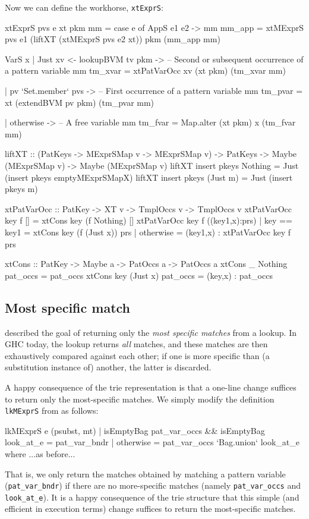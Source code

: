 \documentclass[acmsmall]{acmart}
\theoremstyle{theorem}
\theoremstyle{definition}
\theoremstyle{remark}
\begin{document}
Now we can define the workhorse, \lstinline{xtExprS}:
\begin{code}
xtExprS pvs e xt pkm mm
  = case e of
      AppS e1 e2 -> mm { mm_app = xtMExprS pvs e1 (liftXT (xtMExprS pvs e2 xt))
                                           pkm (mm_app mm) }

      VarS x | Just xv <- lookupBVM tv pkm
             -> -- Second or subsequent occurrence of a pattern variable
                mm { tm_xvar = xtPatVarOcc xv (xt pkm) (tm_xvar mm) }

             | pv `Set.member` pvs
             -> -- First occurrence of a pattern variable
                mm { tm_pvar = xt (extendBVM pv pkm) (tm_pvar mm) }

             | otherwise
             -> -- A free variable
                mm { tm_fvar = Map.alter (xt pkm) x (tm_fvar mm) }

liftXT :: (PatKeys -> MExprSMap v -> MExprSMap v)
        -> PatKeys -> Maybe (MExprSMap v) -> Maybe (MExprSMap v)
liftXT insert pkeys Nothing  = Just (insert pkeys emptyMExprSMapX)
liftXT insert pkeys (Just m) = Just (insert pkeys m)

xtPatVarOcc :: PatKey -> XT v -> TmplOccs v -> TmplOccs v
xtPatVarOcc key f []
  = xtCons key (f Nothing) []
xtPatVarOcc key f ((key1,x):prs)
  | key == key1 = xtCons key (f (Just x)) prs
  | otherwise   = (key1,x) : xtPatVarOcc key f prs

xtCons :: PatKey -> Maybe a -> PatOccs a -> PatOccs a
xtCons _   Nothing  pat_occs = pat_occs
xtCons key (Just x) pat_occs = (key,x) : pat_occs
\end{code}

\subsection{Most specific match}

 described the goal of returning only the \emph{most specific matches} from
a lookup.  In GHC today, the lookup returns \emph{all} matches, and these matches are then
exhaustively compared against each other; if one is more specific than (a substitution instance of) another, the latter is discarded.

A happy consequence of the trie representation is that a one-line change suffices
to return only the most-specific matches.  We simply modify the definition \lstinline{lkMExprS} from  as follows:
\begin{code}
lkMExprS e (psubst, mt)
  | isEmptyBag pat_var_occs && isEmptyBag look_at_e
  = pat_var_bndr
  | otherwise
  = pat_var_occs `Bag.union` look_at_e
  where
    ...as before...
\end{code}
That is, we only return the matches obtained by matching a pattern variable (\lstinline{pat_var_bndr}) if there
are no more-specific matches (namely \lstinline{pat_var_occs} and \lstinline{look_at_e}).  It is a happy
consequence of the trie structure that this simple (and efficient in execution terms) change suffices
to return the most-specific matches.
\end{document}
